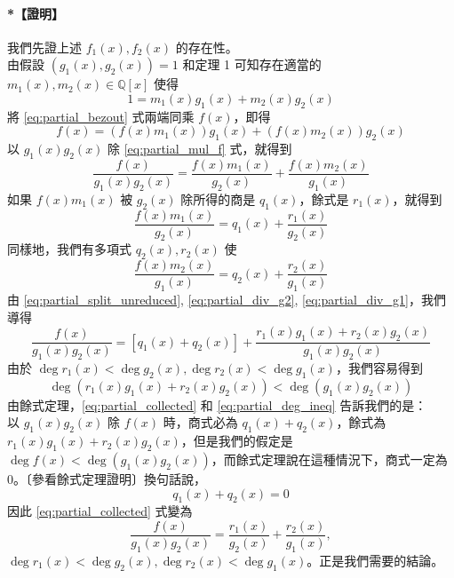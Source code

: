 \paragraph{*【證明】}
我們先證上述 $f_1(x), f_2(x)$ 的存在性。\\
由假設 $(g_1(x), g_2(x)) = 1$ 和定理 1 可知存在適當的 $m_1(x), m_2(x) \in \mathbb{Q}[x]$ 使得
\begin{equation}
  1 = m_1(x)g_1(x) + m_2(x)g_2(x) \label{eq:partial_bezout}
\end{equation}
將 \eqref{eq:partial_bezout} 式兩端同乘 $f(x)$，即得
\begin{equation}
  f(x) = (f(x)m_1(x))g_1(x) + (f(x)m_2(x))g_2(x) \label{eq:partial_mul_f}
\end{equation}
以 $g_1(x)g_2(x)$ 除 \eqref{eq:partial_mul_f} 式，就得到
\begin{equation}
  \frac{f(x)}{g_1(x)g_2(x)} = \frac{f(x)m_1(x)}{g_2(x)} + \frac{f(x)m_2(x)}{g_1(x)} \label{eq:partial_split_unreduced}
\end{equation}
如果 $f(x)m_1(x)$ 被 $g_2(x)$ 除所得的商是 $q_1(x)$，餘式是 $r_1(x)$，就得到
\begin{equation}
  \frac{f(x)m_1(x)}{g_2(x)} = q_1(x) + \frac{r_1(x)}{g_2(x)} \label{eq:partial_div_g2}
\end{equation}
同樣地，我們有多項式 $q_2(x), r_2(x)$ 使
\begin{equation}
  \frac{f(x)m_2(x)}{g_1(x)} = q_2(x) + \frac{r_2(x)}{g_1(x)} \label{eq:partial_div_g1}
\end{equation}
由 \eqref{eq:partial_split_unreduced}, \eqref{eq:partial_div_g2}, \eqref{eq:partial_div_g1}，我們導得
\begin{equation}
  \frac{f(x)}{g_1(x)g_2(x)} = [q_1(x)+q_2(x)] + \frac{r_1(x)g_1(x)+r_2(x)g_2(x)}{g_1(x)g_2(x)} \label{eq:partial_collected}
\end{equation}
由於 $\deg r_1(x) < \deg g_2(x), \deg r_2(x) < \deg g_1(x)$，我們容易得到
\begin{equation}
  \deg(r_1(x)g_1(x)+r_2(x)g_2(x)) < \deg(g_1(x)g_2(x)) \label{eq:partial_deg_ineq}
\end{equation}
由餘式定理，\eqref{eq:partial_collected} 和 \eqref{eq:partial_deg_ineq} 告訴我們的是：\\
以 $g_1(x)g_2(x)$ 除 $f(x)$ 時，商式必為 $q_1(x)+q_2(x)$，餘式為 $r_1(x)g_1(x)+r_2(x)g_2(x)$，但是我們的假定是 $\deg f(x) < \deg(g_1(x)g_2(x))$，而餘式定理說在這種情況下，商式一定為 $0$。〔參看餘式定理證明〕換句話說，
\begin{equation*}
  q_1(x)+q_2(x) = 0
\end{equation*}
因此 \eqref{eq:partial_collected} 式變為
\begin{equation*}
  \frac{f(x)}{g_1(x)g_2(x)} = \frac{r_1(x)}{g_2(x)} + \frac{r_2(x)}{g_1(x)},
\end{equation*}
$\deg r_1(x) < \deg g_2(x), \deg r_2(x) < \deg g_1(x)$。正是我們需要的結論。

